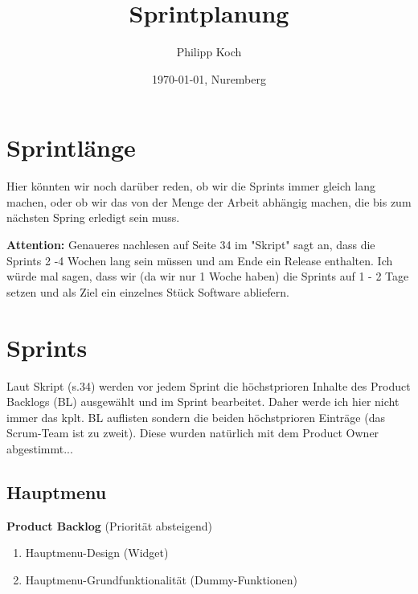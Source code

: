 \documentclass[12pt]{scrartcl}
\title{Sprintplanung}
\author{Philipp Koch}
\date{\today{}, Nuremberg}
\begin{document}
\maketitle

\section{Sprintlänge}
Hier könnten wir noch darüber reden, ob wir die Sprints immer gleich lang machen, oder ob wir das von der Menge der Arbeit abhängig machen, die bis zum nächsten Spring erledigt sein muss.

\textbf{Attention:} Genaueres nachlesen auf Seite 34 im "Skript" sagt an, dass die Sprints 2 -4 Wochen lang sein müssen und am Ende ein Release enthalten. Ich würde mal sagen, dass wir (da wir nur 1 Woche haben) die Sprints auf 1 - 2 Tage setzen und als Ziel ein einzelnes Stück Software abliefern.
\section{Sprints}
Laut Skript (s.34) werden vor jedem Sprint die höchstprioren Inhalte des Product Backlogs (BL) ausgewählt und im Sprint bearbeitet. Daher werde ich hier nicht immer das kplt. BL auflisten sondern die beiden höchstprioren Einträge (das Scrum-Team ist zu zweit). Diese wurden natürlich mit dem Product Owner abgestimmt... 
\subsection{Hauptmenu}
\textbf{Product Backlog} (Priorität absteigend)
\begin{enumerate}
\item Hauptmenu-Design (Widget)
\item Hauptmenu-Grundfunktionalität (Dummy-Funktionen)
\end{enumerate}
\end{document}
